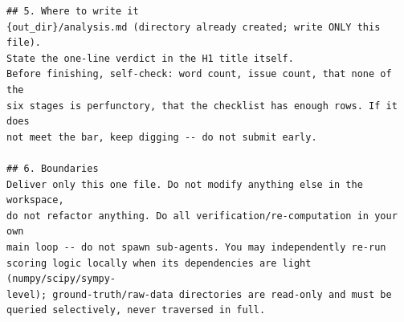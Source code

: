 \begin{lstlisting}[style=prompt]
## 5. Where to write it
{out_dir}/analysis.md (directory already created; write ONLY this file).
State the one-line verdict in the H1 title itself.
Before finishing, self-check: word count, issue count, that none of the
six stages is perfunctory, that the checklist has enough rows. If it does
not meet the bar, keep digging -- do not submit early.

## 6. Boundaries
Deliver only this one file. Do not modify anything else in the workspace,
do not refactor anything. Do all verification/re-computation in your own
main loop -- do not spawn sub-agents. You may independently re-run
scoring logic locally when its dependencies are light (numpy/scipy/sympy-
level); ground-truth/raw-data directories are read-only and must be
queried selectively, never traversed in full.
\end{lstlisting}